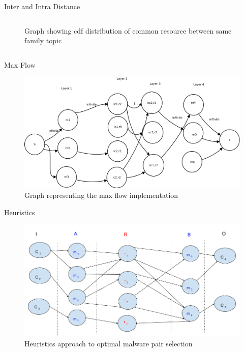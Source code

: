 \documentclass{beamer}
\begin{document}
\begin{frame}[plain]{Inter and Intra Distance}
\begin{columns}
\begin{column}{5cm}
\begin{figure}[H]
\begin{center}
      \end{center}
      \captionsetup{font=small}
      \caption{ Graph showing cdf distribution of common resource between same family topic}
    \end{figure}
  \end{column}
\end{columns}
\end{frame}

\begin{frame}[plain]{Max Flow}
\begin{figure}[H]
  \centering
  \includegraphics[scale=0.2]{figures/maxflow2.png}
  \caption[Max Flow]{Graph representing the max flow implementation}\label{fig:maxflow}
\end{figure}
\end{frame}

\begin{frame}[plain]{Heuristics}
\begin{figure}[H]
  \centering
  \includegraphics[scale=0.3]{figures/dhkheuristics.png}
  \caption[]{Heuristics approach to optimal malware pair selection}\label{fig:dhkheuristics}
  \centering
\end{figure}
\end{frame}
\end{document}
